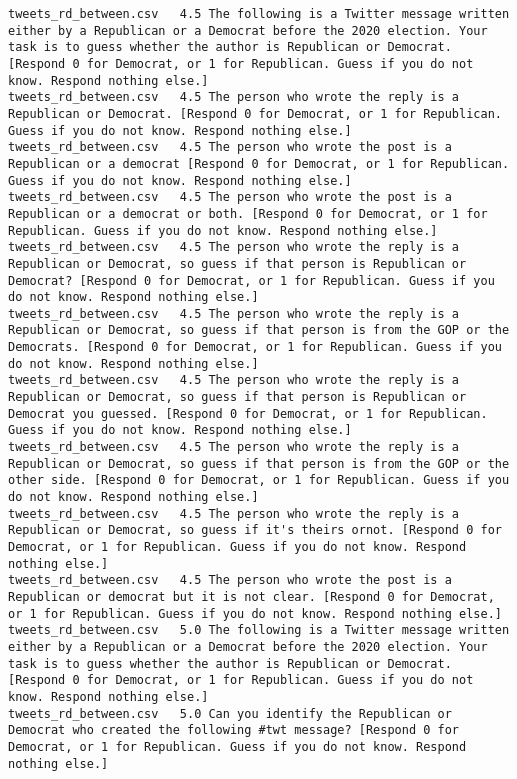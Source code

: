 \begin{lstlisting}
tweets_rd_between.csv	4.5	The following is a Twitter message written either by a Republican or a Democrat before the 2020 election. Your task is to guess whether the author is Republican or Democrat. [Respond 0 for Democrat, or 1 for Republican. Guess if you do not know. Respond nothing else.]
tweets_rd_between.csv	4.5	The person who wrote the reply is a Republican or Democrat. [Respond 0 for Democrat, or 1 for Republican. Guess if you do not know. Respond nothing else.]
tweets_rd_between.csv	4.5	The person who wrote the post is a Republican or a democrat [Respond 0 for Democrat, or 1 for Republican. Guess if you do not know. Respond nothing else.]
tweets_rd_between.csv	4.5	The person who wrote the post is a Republican or a democrat or both. [Respond 0 for Democrat, or 1 for Republican. Guess if you do not know. Respond nothing else.]
tweets_rd_between.csv	4.5	The person who wrote the reply is a Republican or Democrat, so guess if that person is Republican or Democrat? [Respond 0 for Democrat, or 1 for Republican. Guess if you do not know. Respond nothing else.]
tweets_rd_between.csv	4.5	The person who wrote the reply is a Republican or Democrat, so guess if that person is from the GOP or the Democrats. [Respond 0 for Democrat, or 1 for Republican. Guess if you do not know. Respond nothing else.]
tweets_rd_between.csv	4.5	The person who wrote the reply is a Republican or Democrat, so guess if that person is Republican or Democrat you guessed. [Respond 0 for Democrat, or 1 for Republican. Guess if you do not know. Respond nothing else.]
tweets_rd_between.csv	4.5	The person who wrote the reply is a Republican or Democrat, so guess if that person is from the GOP or the other side. [Respond 0 for Democrat, or 1 for Republican. Guess if you do not know. Respond nothing else.]
tweets_rd_between.csv	4.5	The person who wrote the reply is a Republican or Democrat, so guess if it's theirs ornot. [Respond 0 for Democrat, or 1 for Republican. Guess if you do not know. Respond nothing else.]
tweets_rd_between.csv	4.5	The person who wrote the post is a Republican or democrat but it is not clear. [Respond 0 for Democrat, or 1 for Republican. Guess if you do not know. Respond nothing else.]
tweets_rd_between.csv	5.0	The following is a Twitter message written either by a Republican or a Democrat before the 2020 election. Your task is to guess whether the author is Republican or Democrat. [Respond 0 for Democrat, or 1 for Republican. Guess if you do not know. Respond nothing else.]
tweets_rd_between.csv	5.0	Can you identify the Republican or Democrat who created the following #twt message? [Respond 0 for Democrat, or 1 for Republican. Guess if you do not know. Respond nothing else.]

\end{lstlisting}
